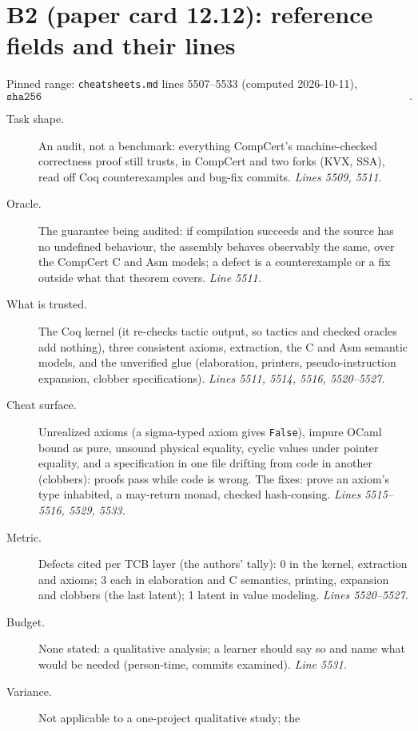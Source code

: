 \documentclass[11pt]{article}
\begin{document}
\section*{B2 (paper card 12.12): reference fields and their lines}

Pinned range: \texttt{cheatsheets.md} lines 5507--5533 (computed 2026-10-11),
\[ \texttt{sha256 533d07ab0f8f5ab0124ca406b4ee1f805f83d56d626979c023ac7947a30dabba}. \]

\begin{description}
\item[Task shape.] An audit, not a benchmark: everything CompCert's
  machine-checked correctness proof still trusts, in CompCert and two forks
  (KVX, SSA), read off Coq counterexamples and bug-fix commits.
  \emph{Lines 5509, 5511.}
\item[Oracle.] The guarantee being audited: if compilation succeeds and the
  source has no undefined behaviour, the assembly behaves observably the same,
  over the CompCert C and Asm models; a defect is a counterexample or a fix
  outside what that theorem covers. \emph{Line 5511.}
\item[What is trusted.] The Coq kernel (it re-checks tactic output, so
  tactics and checked oracles add nothing), three consistent axioms,
  extraction, the C and Asm semantic models, and the unverified glue
  (elaboration, printers, pseudo-instruction expansion, clobber
  specifications). \emph{Lines 5511, 5514, 5516, 5520--5527.}
\item[Cheat surface.] Unrealized axioms (a sigma-typed axiom gives
  \texttt{False}), impure OCaml bound as pure, unsound physical equality,
  cyclic values under pointer equality, and a specification in one file
  drifting from code in another (clobbers): proofs pass while code is wrong.
  The fixes: prove an axiom's type inhabited, a may-return monad, checked
  hash-consing. \emph{Lines 5515--5516, 5529, 5533.}
\item[Metric.] Defects cited per TCB layer (the authors' tally): 0 in the
  kernel, extraction and axioms; 3 each in elaboration and C semantics,
  printing, expansion and clobbers (the last latent); 1 latent in value
  modeling. \emph{Lines 5520--5527.}
\item[Budget.] None stated: a qualitative analysis; a learner should say so
  and name what would be needed (person-time, commits examined).
  \emph{Line 5531.}
\item[Variance.] Not applicable to a one-project qualitative study; the

\end{description}
\end{document}
